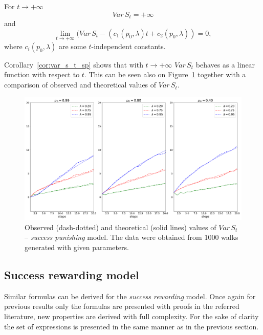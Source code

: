 \documentclass[runningheads]{CMSIM}
\begin{document}
    \begin{corollary}
        \label{cor:var_s_t_sp}For $t\rightarrow+\infty$
        \[
            Var\,S_{t}=+\infty
        \]
        and
        \[
            \lim_{t\rightarrow+\infty}(Var\,S_{t}-(c_{1}(p_{0},\lambda)t+c_{2}(p_{0},\lambda))=0,
        \]
        where $c_{i}(p_{0},\lambda)$ are some $t$-independent constants.
    \end{corollary}

    Corollary~\ref{cor:var_s_t_sp} shows that with $t\rightarrow+\infty$
    $Var\,S_{t}$ behaves as a linear function with respect to $t$.
    This
    can be seen also on Figure~\ref{fig:var_s_t_sp} together with a
    comparison of observed and theoretical values of $Var\,S_{t}$.

    \begin{figure}
        \includegraphics[width=1\textwidth]{../simulations/e_position_1000_walks_20_steps_type_success_punished}

        \caption{\label{fig:var_s_t_sp}Observed (dash-dotted) and theoretical (solid
        lines) values of $Var\,S_{t}$ -- \emph{success punishing }model.
        The
        data were obtained from 1000 walks generated with given parameters. }

    \end{figure}

    \subsection{Success rewarding model}\label{subsec:success-rewarding-model}

    Similar formulas can be derived for the \emph{success rewarding }model.
    Once again for previous results only the formulas are presented with
    proofs in the referred literature, new properties are derived with
    full complexity.
    For the sake of clarity the set of expressions is
    presented in the same manner as in the previous section.
\end{document}

